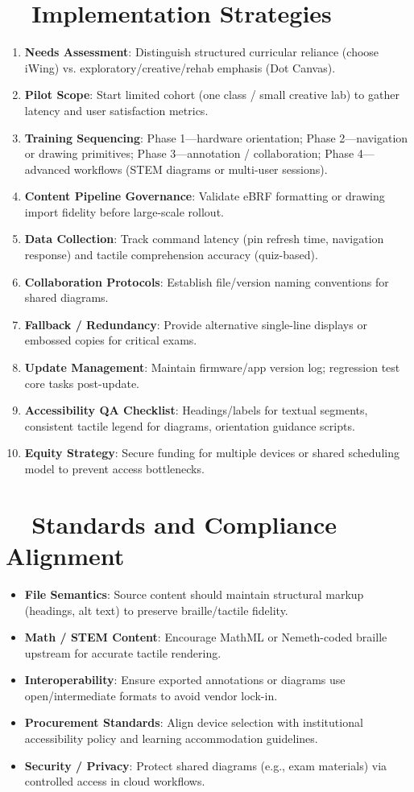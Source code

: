 \section{~~Implementation Strategies}
\label{sec:sr29-implementation}
\begin{enumerate}
	\item \textbf{Needs Assessment}: Distinguish structured curricular reliance (choose iWing) vs. exploratory/creative/rehab emphasis (Dot Canvas).
	\item \textbf{Pilot Scope}: Start limited cohort (one class / small creative lab) to gather latency and user satisfaction metrics.
	\item \textbf{Training Sequencing}: Phase 1—hardware orientation; Phase 2—navigation or drawing primitives; Phase 3—annotation / collaboration; Phase 4—advanced workflows (STEM diagrams or multi-user sessions).
	\item \textbf{Content Pipeline Governance}: Validate eBRF formatting or drawing import fidelity before large-scale rollout.
	\item \textbf{Data Collection}: Track command latency (pin refresh time, navigation response) and tactile comprehension accuracy (quiz-based).
	\item \textbf{Collaboration Protocols}: Establish file/version naming conventions for shared diagrams.
	\item \textbf{Fallback / Redundancy}: Provide alternative single-line displays or embossed copies for critical exams.
	\item \textbf{Update Management}: Maintain firmware/app version log; regression test core tasks post-update.
	\item \textbf{Accessibility QA Checklist}: Headings/labels for textual segments, consistent tactile legend for diagrams, orientation guidance scripts.
	\item \textbf{Equity Strategy}: Secure funding for multiple devices or shared scheduling model to prevent access bottlenecks.
\end{enumerate}

\section{~~Standards and Compliance Alignment}
\label{sec:sr29-standards}
\begin{itemize}
	\item \textbf{File Semantics}: Source content should maintain structural markup (headings, alt text) to preserve braille/tactile fidelity.
	\item \textbf{Math / STEM Content}: Encourage MathML or Nemeth-coded braille upstream for accurate tactile rendering.
	\item \textbf{Interoperability}: Ensure exported annotations or diagrams use open/intermediate formats to avoid vendor lock-in.
	\item \textbf{Procurement Standards}: Align device selection with institutional accessibility policy and learning accommodation guidelines.
	\item \textbf{Security / Privacy}: Protect shared diagrams (e.g., exam materials) via controlled access in cloud workflows.
\end{itemize}

